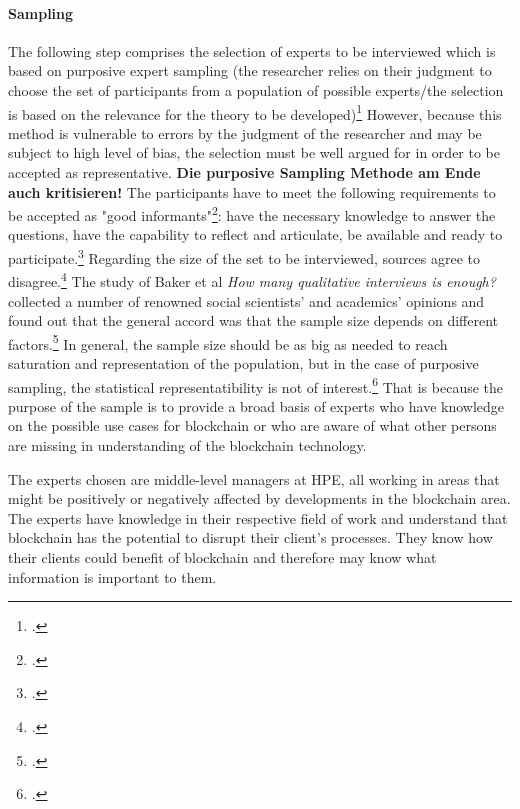 \paragraph{Sampling} The following step comprises the selection of experts to be interviewed which is based on purposive expert sampling (the researcher relies on their judgment to choose the set of participants from a population of possible experts/the selection is based on the relevance for the theory to be developed)\footcites[Cf.][p.137 et seqq]{Flickintroductionqualitativeresearch2009}[cf.][p.16]{EdwardsWhatqualitativeinterviewing2013} However, because this method is vulnerable to errors by the judgment of the researcher and may be subject to high level of bias, the selection must be well argued for in order to be accepted as representative. \textbf{Die purposive Sampling Methode am Ende auch kritisieren!} The participants have to meet the following requirements to be accepted as "good informants"\footcite[][p.73]{MorseDeterminingsamplesize2000}: have the necessary knowledge to answer the questions, have the capability to reflect and articulate, be available and ready to participate.\footcite[Cf.][p.138]{Flickintroductionqualitativeresearch2009} Regarding the size of the set to be interviewed, sources agree to disagree.\footcites[Cf. in addition][p.1]{MorseDeterminingsamplesize2000}[cf.][p.134]{KrugerqualitativeInhaltsanalyseMethode2004} The study of Baker et al \textit{How many qualitative interviews is enough?} collected a number of renowned social scientists' and academics' opinions and found out that the general accord was that the sample size depends on different factors.\footcites[Cf.][p.4 et seqq]{BakerHowmanyqualitative2012} In general, the sample size should be as big as needed to reach saturation and representation of the population, but in the case of purposive sampling, the statistical representatibility is not of interest.\footcite[Cf.][p.144]{MasonQualitativeresearching2002} That is because the purpose of the sample is to provide a broad basis of experts who have knowledge on the possible use cases for blockchain or who are aware of what other persons are missing in understanding of the blockchain technology.

The experts chosen are middle-level managers at HPE, all working in areas that might be positively or negatively affected by developments in the blockchain area. The experts have knowledge in their respective field of work and understand that blockchain has the potential to disrupt their client's processes. They know how their clients could benefit of blockchain and therefore may know what information is important to them.


